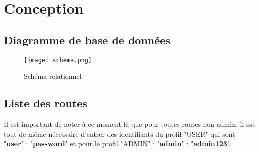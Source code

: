 \documentclass{article}
\begin{document}
\section{Conception}
\subsection{Diagramme de base de données}
   \begin{figure}[hbt!]
        \centering
        \vspace{}
        \texttt{[image: schema.png]}
        \caption{Schéma relationnel}
        \label{fig:enter-label}
    \end{figure}
\subsection{Liste des routes}
Il est important de noter à ce moment-là que pour toutes routes non-admin, il est tout de même nécessaire d'entrer des identifiants du profil "USER" qui sont
"\textbf{user}" : "\textbf{password}"
et pour le profil "ADMIN" :  "\textbf{admin}" : "\textbf{admin123}".
\end{document}
